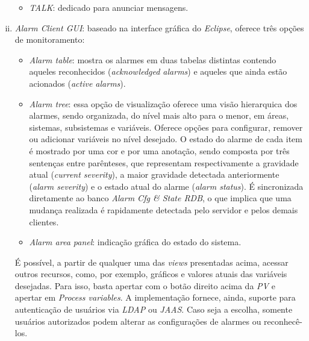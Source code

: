 \begin{enumerate}[i.]
\begin{itemize}
    \item \textit{TALK}: dedicado para anunciar mensagens.
    
  \end{itemize}
  
  \item \textit{Alarm Client GUI}: \label{client-gui} baseado na interface
  gráfica do \textit{Eclipse}, oferece três opções de monitoramento:
  
  \begin{itemize} \renewcommand\labelitemi{--}
    \item \textit{Alarm table}: mostra os alarmes em duas tabelas distintas
    contendo aqueles reconhecidos (\textit{acknowledged alarms}) e aqueles que
    ainda estão acionados (\textit{active alarms}).
    
    \item \textit{Alarm tree}: essa opção de visualização oferece
    uma visão hierarquica dos alarmes, sendo organizada, do nível mais alto para
    o menor, em áreas, sistemas, subsistemas e variáveis. Oferece opções para
    configurar, remover ou adicionar variáveis no nível desejado. O estado do
    alarme de cada item é mostrado por uma cor e por uma anotação, sendo
    composta por três sentenças entre parênteses, que representam
    respectivamente a gravidade atual (\textit{current severity}), a
    maior gravidade detectada anteriormente (\textit{alarm severity}) e o estado
    atual do alarme (\textit{alarm status}). É sincronizada diretamente ao banco
    \textit{Alarm Cfg \& State RDB}, o que implica que uma mudança realizada é
    rapidamente detectada pelo servidor e pelos demais clientes.
    
    \item \textit{Alarm area panel}: indicação gráfica do estado do sistema.
    
  \end{itemize}
  
  É possível, a partir de qualquer uma das \textit{views} presentadas acima,
  acessar outros recursos, como, por exemplo, gráficos e valores atuais das
  variáveis desejadas. Para isso, basta apertar com o botão direito acima da
  \textit{PV} e apertar em \textit{Process variables}. A implementação fornece,
  ainda, suporte para autenticação de usuários via \textit{LDAP} ou
  \textit{JAAS}. Caso seja a escolha, somente usuários autorizados podem alterar
  as configurações de alarmes ou reconhecê-los.
  
\end{enumerate}

